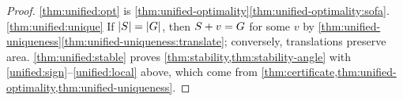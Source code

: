 \begin{proof}
\ref{thm:unified:opt} is
\cref{thm:unified-optimality}\ref{thm:unified-optimality:sofa}.
\ref{thm:unified:unique} If $\lvert S\rvert=\lvert G\rvert$, then $S+v=G$ for some $v$ by
\cref{thm:unified-uniqueness}\ref{thm:unified-uniqueness:translate};
conversely, translations preserve area.
\ref{thm:unified:stable}  proves
\cref{thm:stability,thm:stability-angle} with
\ref{unified:sign}--\ref{unified:local} above, which come from
\cref{thm:certificate,thm:unified-optimality,thm:unified-uniqueness}.
\end{proof}
